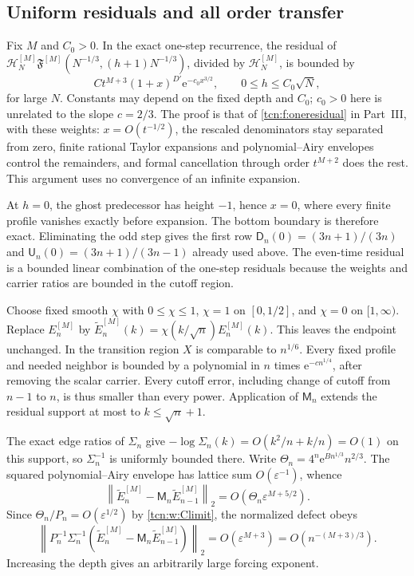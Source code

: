 \documentclass[11pt,letterpaper]{article}
\newcommand{\norm}[1]{\left\lVert#1\right\rVert}
\newcommand{\eps}{\varepsilon}
\newcommand{\ee}{\mathrm e}
\theoremstyle{remark}
\begin{document}
\subsection{Uniform residuals and all order transfer}
Fix $M$ and $C_0>0$. In the exact one-step recurrence, the residual of
$\mathcal H_N^{[M]}\mathfrak F^{[M]}(N^{-1/3},(h+1)N^{-1/3})$, divided by $\mathcal H_N^{[M]}$, is bounded by
\begin{equation}\label{tcn:w:uniformres}
 Ct^{M+3}(1+x)^{D'}\ee^{-c_0x^{3/2}},\qquad 0\le h\le C_0\sqrt N,
\end{equation}
for large $N$. Constants may depend on the fixed depth and $C_0$; $c_0>0$ here is unrelated to the slope $c=2/3$. The proof is that of \eqref{tcn:f:oneresidual} in Part~III, with these weights: $x=O(t^{-1/2})$, the rescaled denominators stay separated from zero, finite rational Taylor expansions and polynomial--Airy envelopes control the remainders, and formal cancellation through order $t^{M+2}$ does the rest. This argument uses no convergence of an infinite expansion.

At $h=0$, the ghost predecessor has height $-1$, hence $x=0$, where every finite profile vanishes exactly before expansion. The bottom boundary is therefore exact. Eliminating the odd step gives the first row $\mathsf D_n(0)=(3n+1)/(3n)$ and $\mathsf U_n(0)=(3n+1)/(3n-1)$ already used above. The even-time residual is a bounded linear combination of the one-step residuals because the weights and carrier ratios are bounded in the cutoff region.

Choose fixed smooth $\chi$ with $0\le\chi\le1$, $\chi=1$ on $[0,1/2]$, and $\chi=0$ on $[1,\infty)$. Replace $E_n^{[M]}$ by
$\widetilde E_n^{[M]}(k)=\chi(k/\sqrt n)E_n^{[M]}(k)$.
This leaves the endpoint unchanged. In the transition region $X$ is comparable to $n^{1/6}$. Every fixed profile and needed neighbor is bounded by a polynomial in $n$ times $\ee^{-cn^{1/4}}$, after removing the scalar carrier. Every cutoff error, including change of cutoff from $n-1$ to $n$, is thus smaller than every power. Application of $\mathsf M_n$ extends the residual support at most to $k\le\sqrt n+1$.

The exact edge ratios of $\Sigma_n$ give $-\log \Sigma_n(k)=O(k^2/n+k/n)=O(1)$ on this support, so $\Sigma_n^{-1}$ is uniformly bounded there. Write
$\Theta_n=4^n\ee^{Bn^{1/3}}n^{2/3}$.
The squared polynomial--Airy envelope has lattice sum $O(\eps^{-1})$, whence
\[
 \norm{\widetilde E_n^{[M]}-\mathsf M_n\widetilde E_{n-1}^{[M]}}_2
            =O(\Theta_n\eps^{M+5/2}).
\]
Since $\Theta_n/P_n=O(\eps^{1/2})$ by \eqref{tcn:w:Climit}, the normalized defect obeys
\begin{equation}\label{tcn:w:normalizedres}
 \norm{P_n^{-1}\Sigma_n^{-1}
   (\widetilde E_n^{[M]}-\mathsf M_n\widetilde E_{n-1}^{[M]})}_2
              =O(\eps^{M+3})=O(n^{-(M+3)/3}).
\end{equation}
Increasing the depth gives an arbitrarily large forcing exponent.
\end{document}
